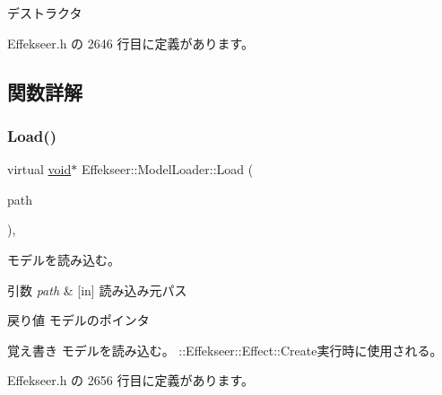 デストラクタ 



 Effekseer.\+h の 2646 行目に定義があります。



\subsection{関数詳解}
\mbox{\label{class_effekseer_1_1_model_loader_a46b7aba9f998836bacd86411b858d06c}} 
\subsubsection{\texorpdfstring{Load()}{Load()}}
{\footnotesize\ttfamily virtual \mbox{\hyperlink{namespace_effekseer_ab34c4088e512200cf4c2716f168deb56}{void}}$\ast$ Effekseer\+::\+Model\+Loader\+::\+Load (\begin{DoxyParamCaption}\item[{const \mbox{\hyperlink{_effekseer_8h_a50b026abea014b47854bcd835b3b6233}{E\+F\+K\+\_\+\+C\+H\+AR}} $\ast$}]{path }\end{DoxyParamCaption})\hspace{0.3cm}{\ttfamily [inline]}, {\ttfamily [virtual]}}



モデルを読み込む。 


\begin{DoxyParams}{引数}
{\em path} & \mbox{[}in\mbox{]} 読み込み元パス \\
\hline
\end{DoxyParams}
\begin{DoxyReturn}{戻り値}
モデルのポインタ 
\end{DoxyReturn}
\begin{DoxyNote}{覚え書き}
モデルを読み込む。 \+::\+Effekseer\+::\+Effect\+::\+Create実行時に使用される。 
\end{DoxyNote}


 Effekseer.\+h の 2656 行目に定義があります。

\mbox{\label{class_effekseer_1_1_model_loader_a496f93a8615363ff31943adb205b5365}} 
